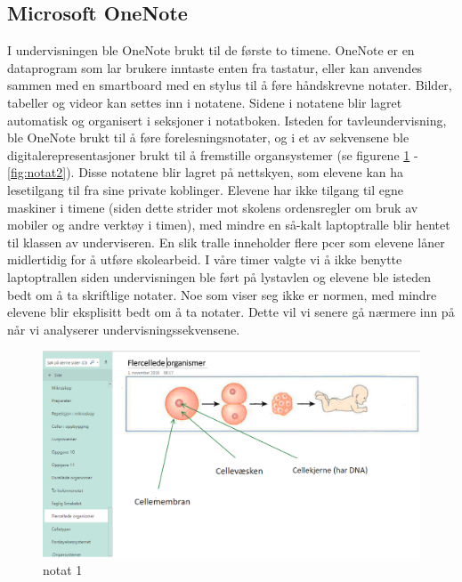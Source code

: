 \documentclass[main.tex]{subfiles}
\begin{document}
\subsection*{Microsoft OneNote}

I undervisningen ble OneNote brukt til de første to timene. OneNote er en dataprogram som lar 
brukere inntaste enten fra tastatur, eller kan anvendes sammen med en smartboard med en stylus til å
føre håndskrevne notater. Bilder, tabeller og videor kan settes inn i notatene. Sidene i notatene 
blir lagret automatisk og organisert i seksjoner i notatboken. Isteden for tavleundervisning, 
ble OneNote brukt til å føre forelesningsnotater, og i et av sekvensene ble 
digitalerepresentasjoner brukt til å fremstille organsystemer (se figurene \ref{fig:notat1} -
\ref{fig:notat2}). Disse notatene blir lagret på nettskyen, som elevene kan ha lesetilgang til
fra sine private koblinger. Elevene har ikke tilgang til egne maskiner i timene (siden dette 
strider mot skolens ordensregler om bruk av mobiler og andre verktøy i timen), med mindre en 
så-kalt laptoptralle blir hentet til klassen av underviseren. En slik tralle inneholder flere 
pcer som elevene låner midlertidig for å utføre skolearbeid. I våre timer valgte vi å ikke 
benytte laptoptrallen siden undervisningen ble ført på lystavlen og elevene ble isteden bedt 
om å ta skriftlige notater. Noe som viser seg ikke er normen, med mindre elevene blir 
eksplisitt bedt om å ta notater. Dette vil vi senere gå nærmere inn på når vi analyserer 
undervisningssekvensene.

\begin{figure}[h!]
\includegraphics[scale = 0.6]{../figures/onenote_flercellet.png}
\caption{notat 1}
\label{fig:notat1}
\end{figure}
\end{document}
